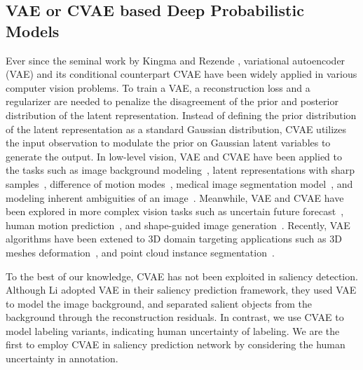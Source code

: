 \documentclass[10pt,twocolumn,letterpaper]{article}
\begin{document}
\subsection{VAE or CVAE based Deep Probabilistic Models}
Ever since the seminal work by Kingma \etal \cite{vae_bayes_kumar} and Rezende \etal \cite{pmlr-v32-rezende14}, variational autoencoder (VAE) and its conditional counterpart CVAE \cite{structure_output} have been widely applied in various computer vision problems. 
To train a VAE, a reconstruction loss and a regularizer are needed to penalize the disagreement of the prior and posterior distribution of the latent representation. 
Instead of defining the prior distribution of the latent representation as a standard Gaussian distribution, CVAE utilizes the input observation to modulate the prior on Gaussian latent variables to generate the output.
In low-level vision, VAE and CVAE have been applied to the tasks such as image background modeling~\cite{SuperVAE_AAAI19}, latent representations with sharp samples~\cite{pixel_vae}, difference of motion modes~\cite{MT-VAE}, medical image segmentation model~\cite{PHiSeg2019}, and modeling inherent ambiguities of an image~\cite{probabilistic_unet}.
Meanwhile, VAE and CVAE have been explored in more complex vision tasks such as uncertain future forecast~\cite{ContrastiveVAE,vae_future}, human motion prediction~\cite{aliakbarian2019learning}, and shape-guided image generation~\cite{Esser_2018_CVPR}. Recently, VAE algorithms have been extened to 3D domain targeting applications such as 3D meshes deformation~\cite{Tan_2018_CVPR}, and point cloud instance segmentation~\cite{Yi_2019_CVPR}. 




To the best of our knowledge, CVAE has not been exploited in saliency detection. Although Li \etal \cite{SuperVAE_AAAI19} adopted VAE in their saliency prediction framework, they used VAE to model the image background, and separated salient objects from the background through the reconstruction residuals. In contrast, we use CVAE to model labeling variants, indicating human uncertainty of labeling. We are the first to employ CVAE in saliency prediction network by considering the human uncertainty in annotation.
\end{document}
